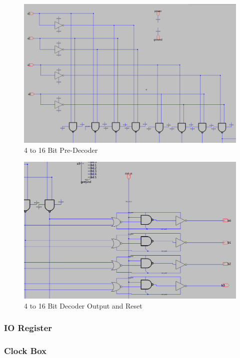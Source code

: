 \documentclass[a4paper]{article}
\begin{document}
\begin{figure}[H]
	\centering
	\includegraphics[scale=0.25]{decoderSchematicPreDecoder}
	\caption{4 to 16 Bit Pre-Decoder}
	\label{fig:decoderSchematicPreDecoder}
\end{figure}

\begin{figure}[H]
	\centering
	\includegraphics[scale=0.3]{decoderSchematicReset}
	\caption{4 to 16 Bit Decoder Output and Reset}
	\label{fig:decoderSchematicReset}
\end{figure}

\subsubsection{IO Register}
\label{sec:io_register_design}

\subsubsection{Clock Box}
\label{sec:clock_box_design}
\end{document}
